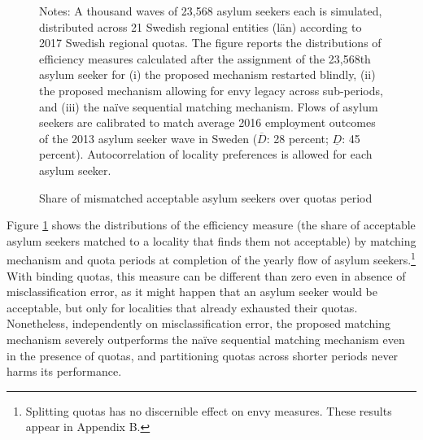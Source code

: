 \documentclass[12pt,fleqn]{article}
\begin{document}
\begin{figure}
	\caption{Share of mismatched acceptable asylum seekers over quotas period \label{FIG-quotas}}
	\begin{center}
	\end{center}
		{\scriptsize \vspace{-1em}
	\begin{singlespace}
		{\sc Notes:} A thousand waves of 23,568 asylum seekers each is simulated, distributed across 21 Swedish regional entities (l\"{a}n) according to 2017 Swedish regional quotas. The figure reports the distributions of efficiency measures calculated after the assignment of the 23,568th asylum seeker for (i) the proposed mechanism restarted blindly, (ii) the proposed mechanism allowing for envy legacy across sub-periods, and (iii) the na\"{i}ve sequential matching mechanism. Flows of asylum seekers are calibrated to match average 2016 employment outcomes of the 2013 asylum seeker wave in Sweden ($\overline{D}$: 28 percent; $\underline{D}$: 45 percent). Autocorrelation of locality preferences is allowed for each asylum seeker.
	\end{singlespace}
	 }
\end{figure}

Figure \ref{FIG-quotas} shows the distributions of the efficiency measure (the share of acceptable asylum seekers matched to a locality that finds them not acceptable) by matching mechanism and quota periods at completion of the yearly flow of asylum seekers.\footnote{Splitting quotas has no discernible effect on envy measures. These results appear in Appendix B.} With binding quotas, this measure can be different than zero even in absence of misclassification error, as it might happen that an asylum seeker would be acceptable, but only for localities that already exhausted their quotas. Nonetheless, independently on misclassification error, the proposed matching mechanism severely outperforms the na\"{i}ve sequential matching mechanism even in the presence of quotas, and partitioning quotas across shorter periods never harms its performance.
\end{document}
